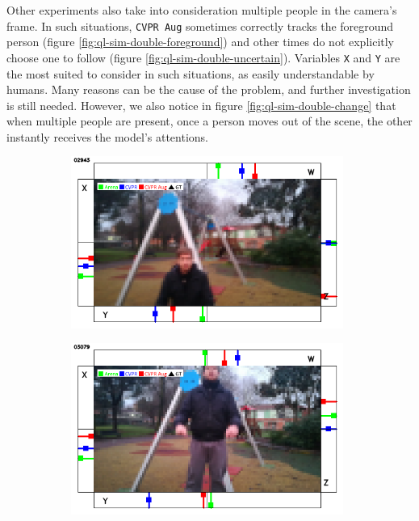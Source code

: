 Other experiments also take into consideration multiple people in the camera's frame. In such situations, \texttt{CVPR Aug} sometimes correctly tracks the foreground person (figure \ref{fig:ql-sim-double-foreground}) and other times do not explicitly choose one to follow (figure \ref{fig:ql-sim-double-uncertain}). Variables \texttt{X} and \texttt{Y} are the most suited to consider in such situations, as easily understandable by humans. Many reasons can be the cause of the problem, and further investigation is still needed. However, we also notice in figure \ref{fig:ql-sim-double-change} that when multiple people are present, once a person moves out of the scene, the other instantly receives the model's attentions.

\begin{figure}[H]
	\begin{center}
		\begin{subfigure}[h]{0.49\textwidth}
			\centering
			\includegraphics[width=0.98\textwidth]{"contents/images/qualitative-videos/jump1-park01-2943"}
		\end{subfigure}
		\hfill
		\begin{subfigure}[h]{0.49\textwidth}
			\centering
			\includegraphics[width=0.98\textwidth]{"contents/images/qualitative-videos/jump1-park01-3079"}

\end{subfigure}
\end{center}
\end{figure}
